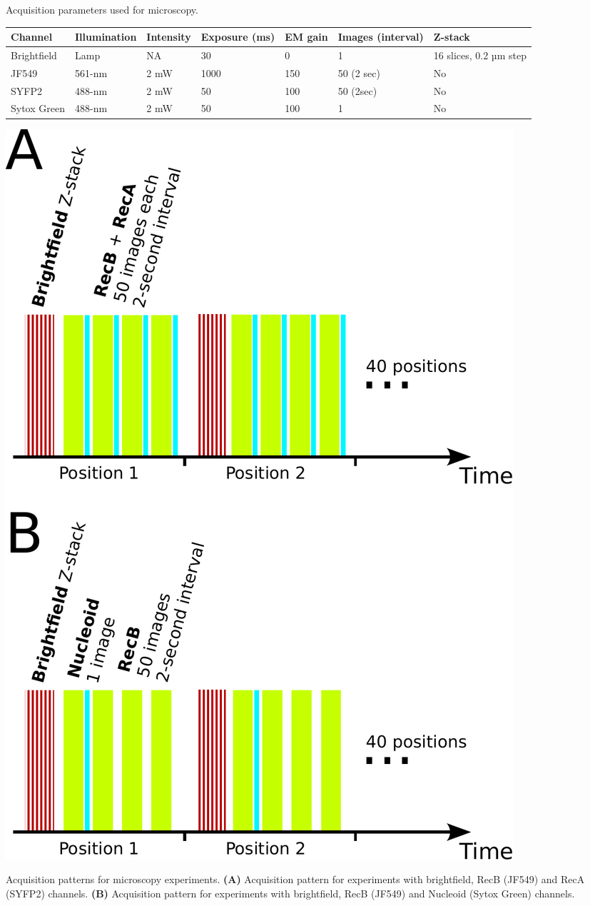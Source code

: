 \begin{supptable}[htbp]
    \centering
    \caption{Acquisition parameters used for microscopy.}
    \begin{tabular}{lllllll}
        \toprule
        Channel & Illumination & Intensity & Exposure (ms) & EM gain & Images (interval) & Z-stack\\
        \midrule
        Brightfield & Lamp & NA & 30 & 0 & 1 & 16 slices, 0.2 µm step\\
        JF549 & 561-nm & 2 mW & 1000 & 150 & 50 (2 sec) & No\\
        SYFP2 & 488-nm & 2 mW & 50 & 100 & 50 (2sec) & No\\
        Sytox Green & 488-nm & 2 mW & 50 & 100 & 1 & No\\
        \bottomrule
    \end{tabular}
    \label{SItab:acquisition_channels}
\end{supptable}

\begin{suppfigure*}[htbp]
    \begin{center}
    \includegraphics[width=.5\textwidth]{SI_Figures/Acquisition_pattern.pdf}
    \end{center}
    \caption{Acquisition patterns for microscopy experiments. \textbf{(A)} Acquisition pattern for experiments with brightfield, RecB (JF549) and RecA (SYFP2) channels. \textbf{(B)} Acquisition pattern for experiments with brightfield, RecB (JF549) and Nucleoid (Sytox Green) channels.}
    \label{SIFig:acquisition_pattern}
\end{suppfigure*}


